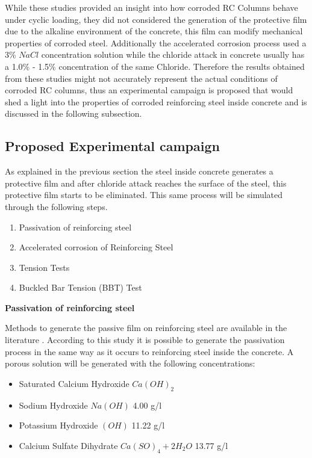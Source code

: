 While these studies provided an insight into how corroded RC Columns behave under cyclic loading, they did not considered the generation of the protective film due to the alkaline environment of the concrete, this film can modify mechanical properties of corroded steel. Additionally the accelerated corrosion process used a 3\% $NaCl$ concentration solution while the chloride attack in concrete usually has a 1.0\% - 1.5\% concentration of the same Chloride. Therefore the results obtained from these studies might not accurately represent the actual conditions of corroded RC columns, thus an experimental campaign is proposed that would shed a light into the properties of corroded reinforcing steel inside concrete and is discussed in the following subsection.

\subsection{Proposed Experimental campaign}

As explained in the previous section the steel inside concrete generates a protective film and after chloride attack reaches the surface of the steel, this protective film starts to be eliminated. This same process will be simulated through the following steps.
\begin{enumerate}
	\item Passivation of reinforcing steel
	\item Accelerated corrosion  of Reinforcing Steel
	\item Tension Tests
	\item Buckled Bar Tension (BBT) Test
\end{enumerate}

\textbf{Passivation of reinforcing steel}

Methods to generate the passive film on reinforcing steel are available in the literature \cite{Ghods2010}. According to this study it is possible to generate the passivation process in the same way as it occurs to reinforcing steel inside the concrete. A porous solution will be generated with the following concentrations:

\begin{itemize}
	\item Saturated Calcium Hydroxide $Ca(OH)_2$
	\item Sodium Hydroxide $Na(OH)$ 4.00 g/l
	\item Potassium Hydroxide $(OH)$ 11.22 g/l
	\item Calcium Sulfate Dihydrate $Ca(SO)_4 + 2H_2O$ 13.77 g/l
\end{itemize}

